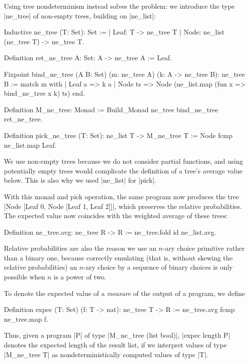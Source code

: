 \documentclass[runningheads]{llncs}
\begin{document}
Using tree nondeterminism instead solves the problem: we introduce the type |ne_tree| of non-empty trees, building on |ne_list|: 
\begin{code}
  Inductive ne_tree (T: Set): Set :=
    | Leaf: T -> ne_tree T
    | Node: ne_list (ne_tree T) -> ne_tree T.

  Definition ret_ne_tree {A: Set}: A -> ne_tree A := Leaf.

  Fixpoint bind_ne_tree (A B: Set)
    (m: ne_tree A) (k: A -> ne_tree B): ne_tree B :=
      match m with
      | Leaf a => k a
      | Node ts => Node (ne_list.map (fun x => bind_ne_tree x k) ts)
      end.

  Definition M_ne_tree: Monad := Build_Monad ne_tree bind_ne_tree ret_ne_tree.

  Definition pick_ne_tree (T: Set): ne_list T -> M_ne_tree T
    := Node fcmp ne_list.map Leaf.
\end{code}
We use non-empty trees because we do not consider partial functions, and using potentially empty trees would complicate the definition of a tree's average value below. This is also why we used |ne_list| for |pick|.

With this monad and pick operation, the same program now produces the tree |Node [Leaf 0, Node [Leaf 1, Leaf 2]]|, which preserves the relative probabilities. The expected value now coincides with the weighted average of these trees:
\begin{code}
  Definition ne_tree.avg: ne_tree R -> R := ne_tree.fold id ne_list.avg.
\end{code}

Relative probabilities are also the reason we use an $n$-ary choice primitive rather than a binary one, because correctly emulating (that is, without skewing the relative probabilities) an $n$-ary choice by a sequence of binary choices is only possible when $n$ is a power of two.

To denote the expected value of a \emph{measure} of the output of a program, we define

\begin{code}
  Definition expec (T: Set) (f: T -> nat): ne_tree T -> R
    := ne_tree.avg fcmp ne_tree.map f.
\end{code}

Thus, given a program |P| of type |M_ne_tree (list bool)|, |expec length P| denotes the expected length of the result list, if we interpret values of type |M_ne_tree T| as nondeterministically computed values of type |T|.
\end{document}
